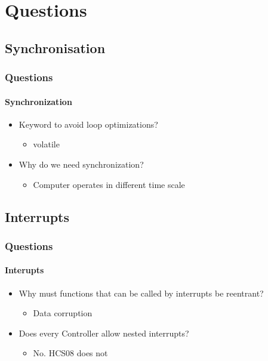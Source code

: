 \section{Questions}
\subsection*{Synchronisation}
\begin{frame}
    \frametitle{Questions}
    \framesubtitle{Synchronization}
    \begin{itemize}
        \item Keyword to avoid loop optimizations?
        \begin{itemize}
        	\item volatile
        \end{itemize}
        \item Why do we need synchronization?
        \begin{itemize}
        	\item Computer operates in different time scale
        \end{itemize}
    \end{itemize}
\end{frame}

\subsection*{Interrupts}
\begin{frame}
    \frametitle{Questions}
    \framesubtitle{Interupts}
    \begin{itemize}
        \item Why must functions that can be called by interrupts be reentrant? 
        \begin{itemize}
        	\item Data corruption
        \end{itemize}
        \item Does every Controller allow nested interrupts? 
        \begin{itemize}
        	\item No. HCS08 does not
        \end{itemize}
    \end{itemize}
\end{frame}

